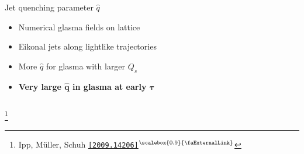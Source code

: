 \documentclass[aspectratio=169,11pt,usenames,dvipsnames]{beamer}
\renewcommand{\thefootnote}{\color{customblue}\faPaperPlaneO}
\newcommand\blfootnote[1]{%
  \begingroup
  \renewcommand\thefootnote{}\footnote{#1}%
  \addtocounter{footnote}{-1}%
  \endgroup
}
\begin{document}
\begin{frame}[t,noframenumbering]
\begin{columns}[onlytextwidth,t]
        \begin{center}
            {\Large\color{isgold} Jet quenching parameter $\hat{q}$\\[10pt]}
            \footnotesize
                \begin{itemize}
                    \item {\color{lightgray}Numerical glasma fields on lattice}
                    \item {\color{lightgray} Eikonal jets along lightlike trajectories}
                     \item {\color{lightgray}More $\hat{q}$ for glasma with larger $Q_s$}\\[15pt]
                    \item {\color{destacado}\bfseries\normalsize Very large $\boldsymbol{\hat{q}}$ in glasma at early $\boldsymbol{\tau}$}
                \end{itemize}
        \end{center}
    \end{columns}
    \blfootnote{\scriptsize Ipp, Müller, Schuh \href{https://arxiv.org/abs/2009.14206}{\color{palgold}\texttt{[2009.14206]}$^\text{\scalebox{0.9}{\faExternalLink}}$}}
\end{frame}

\end{document}
